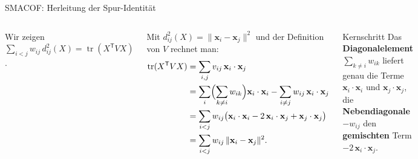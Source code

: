 \begin{frame}{SMACOF: Herleitung der Spur-Identität}
\begin{columns}
Wir zeigen
$\sum_{i<j} w_{ij}\, d_{ij}^2(X) = \operatorname{tr}(X^{\mathsf{T}} V X)$.

\vspace{0.3em}
Mit $d_{ij}^2(X) = \lVert \mathbf{x}_i - \mathbf{x}_j \rVert^2$ und der
Definition von $V$ rechnet man:
\[
  \begin{aligned}
    \operatorname{tr}(X^{\mathsf{T}} V X)
      &= \sum_{i,j} v_{ij}\,\mathbf{x}_i \cdot \mathbf{x}_j\\
      &= \sum_{i} \Bigl(\sum_{k\neq i} w_{ik}\Bigr)\mathbf{x}_i \cdot \mathbf{x}_i
         - \sum_{i\neq j} w_{ij}\,\mathbf{x}_i \cdot \mathbf{x}_j\\
      &= \sum_{i<j} w_{ij}
         \bigl(\mathbf{x}_i \cdot \mathbf{x}_i - 2\,\mathbf{x}_i \cdot \mathbf{x}_j
         + \mathbf{x}_j \cdot \mathbf{x}_j\bigr)\\
      &= \sum_{i<j} w_{ij}\,\lVert \mathbf{x}_i - \mathbf{x}_j \rVert^2.
  \end{aligned}
\]

\begin{block}{Kernschritt}
Das \textbf{Diagonalelement} $\sum_{k\neq i} w_{ik}$ liefert genau die
Terme $\mathbf{x}_i \cdot \mathbf{x}_i$ und $\mathbf{x}_j \cdot \mathbf{x}_j$,
die \textbf{Nebendiagonale} $-w_{ij}$ den \textbf{gemischten} Term
$-2\,\mathbf{x}_i \cdot \mathbf{x}_j$.
\end{block}
\end{columns}

\end{frame}
